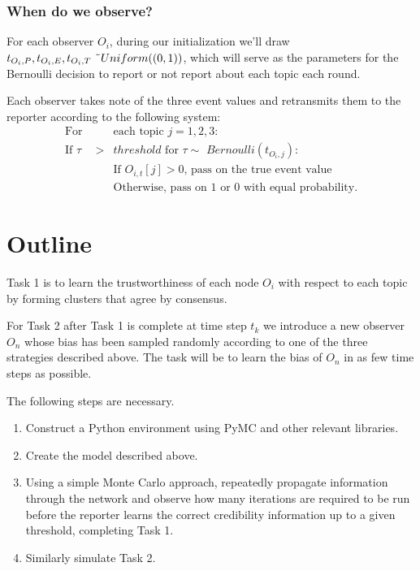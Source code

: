 \documentclass{amsart}
\theoremstyle{definition}
\theoremstyle{plain}
\numberwithin{equation}{section}
\begin{document}
\subsubsection{When do we observe?}

For each observer $O_{i}$, during our initialization we'll draw $%
t_{O_{i},P},t_{O_{i},E},t_{O_{i},T}~\symbol{126}Uniform((0,1))$, which will
serve as the parameters for the Bernoulli decision to report or not report
about each topic each round. 

Each observer takes note of the three event values and retransmits them to
the reporter according to the following system:%
\begin{eqnarray*}
\text{For } &&\text{each topic }j=1,2,3\text{:} \\
\text{If }\tau  &>&threshold\text{ for }\tau \sim \text{~}%
Bernoulli(t_{O_{i},j})\text{:} \\
&&\text{If }O_{i,t}[j]>0\text{, pass on the true event value} \\
&&\text{Otherwise, pass on }1\text{ or }0\text{ with equal probability.}
\end{eqnarray*}

\section{Outline}

Task 1 is to learn the trustworthiness of each node $O_{i}$ with respect to
each topic by forming clusters that agree by consensus.

For Task 2 after Task 1 is complete at time step $t_{k}$ we introduce a new
observer $O_{n}$ whose bias has been sampled randomly according to one of
the three strategies described above. The task will be to learn the bias of $%
O_{n}$ in as few time steps as possible. 

The following steps are necessary.

\begin{enumerate}
\item Construct a Python environment using PyMC and other relevant libraries.

\item Create the model described above.

\item Using a simple Monte Carlo approach, repeatedly propagate information
through the network and observe how many iterations are required to be run
before the reporter learns the correct credibility information up to a given
threshold, completing Task 1.

\item Similarly simulate Task 2.
\end{enumerate}
\end{document}
